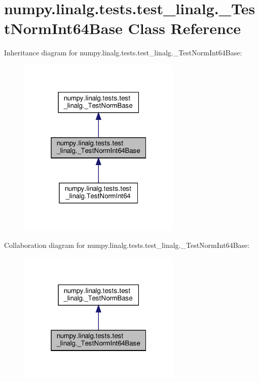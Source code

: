 \hypertarget{classnumpy_1_1linalg_1_1tests_1_1test__linalg_1_1__TestNormInt64Base}{}\section{numpy.\+linalg.\+tests.\+test\+\_\+linalg.\+\_\+\+Test\+Norm\+Int64\+Base Class Reference}
\label{classnumpy_1_1linalg_1_1tests_1_1test__linalg_1_1__TestNormInt64Base}


Inheritance diagram for numpy.\+linalg.\+tests.\+test\+\_\+linalg.\+\_\+\+Test\+Norm\+Int64\+Base\+:
\nopagebreak
\begin{figure}[H]
\begin{center}
\leavevmode
\includegraphics[width=220pt]{classnumpy_1_1linalg_1_1tests_1_1test__linalg_1_1__TestNormInt64Base__inherit__graph}
\end{center}
\end{figure}


Collaboration diagram for numpy.\+linalg.\+tests.\+test\+\_\+linalg.\+\_\+\+Test\+Norm\+Int64\+Base\+:
\nopagebreak
\begin{figure}[H]
\begin{center}
\leavevmode
\includegraphics[width=220pt]{classnumpy_1_1linalg_1_1tests_1_1test__linalg_1_1__TestNormInt64Base__coll__graph}
\end{center}
\end{figure}
